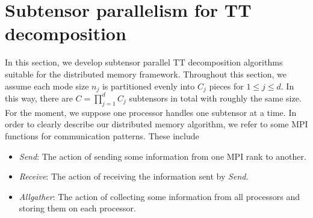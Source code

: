 \documentclass[11pt,a4paper,review]{siamart220329}
\begin{document}
\section{Subtensor parallelism for TT decomposition}
\label{sec:subTTcross}
In this section, we develop subtensor parallel TT decomposition algorithms suitable for the distributed memory framework. Throughout this section, we assume each mode size $n_j$ is partitioned evenly into $C_j$ pieces for $1 \le j \le d$. In this way, there are $C = \prod_{j=1}^d C_j$ subtensors in total with roughly the same size. For the moment, we suppose one processor handles one subtensor at a time. In order to clearly describe our distributed memory algorithm, we refer to some MPI functions for communication patterns. These include
\begin{itemize}[leftmargin=*,noitemsep]
\item \textit{Send}: The action of sending some information from one MPI rank to another.
\item \textit{Receive}: The action of receiving the information sent by \textit{Send}.
\item \textit{Allgather}: The action of collecting some information from all processors and storing them on each processor.
\end{itemize}
\end{document}
